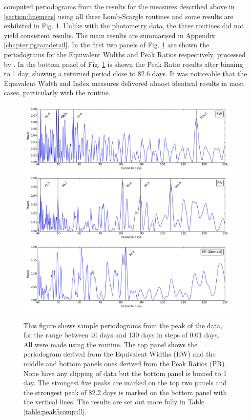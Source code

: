 {\FirstP} computed periodograms from the results for the measures described above in \ref{section:linemeas} using all
three Lomb-Scargle routines and some results are exhibited in Fig. \ref{fig:harpspgrams1}. Unlike with the {\asas}
photometry data, the three routines did not yield consistent results. The main results are summarised in Appendix \ref{chapter:pgramdetail}. In the first two panels of Fig. \ref{fig:harpspgrams1} are shown the periodograms for the
Equivalent Widths and Peak Ratios respectively, processed by {\gatspy}. In the bottom panel of
Fig. \ref{fig:harpspgrams1} is shown the Peak Ratio results after binning to 1 day, showing a returned period close to
82.6 days. It was noticeable that the Equivalent Width and {\ha} Index measures delivered almost identical results in
most cases, particularly with the {\gatspy} routine.


\begin{figure}[!htbp]
\begin{center}
\includegraphics[scale=0.18]{Figures/summpgrams.png} \\
\end{center}   
\caption{This figure shows sample periodograms from the {\ha} peak of the {\harps} data, for the range between 40 days
  and 130 days in steps of 0.01 days. All were made using the {\gatspy} routine.  The top panel shows the periodogram
  derived from the Equivalent Widths (EW) and the middle and bottom panels ones derived from the Peak Ratios (PR). None
  have any clipping of data but the bottom panel is binned to 1 day.  The strongest five peaks are marked on the top two
  panels and the strongest peak of 82.2 days is marked on the bottom panel with the vertical lines.  The results are set
  out more fully in Table \ref{table:peak5compall}.}
\protect\label{fig:harpspgrams1}
\end{figure}

